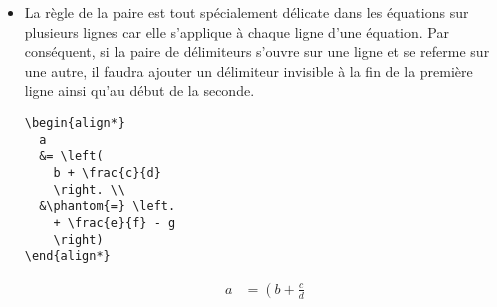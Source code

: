 \begin{itemize}
\begin{demo}
\begin{texample}
\begin{equation*}
\begin{aligned}
            1 - x, &\quad x < 1 \\
            x - 1, &\quad x \geq 1
          \end{aligned}
        \right.
      \end{equation*}
    \end{texample}
  \end{demo}
  (L'environnement  utilisé ci-dessus provient de
  .) On notera au passage que l'environnement 
  de  rend plus simple la réalisation de constructions
  comme celle ci-dessus.
  \begin{demo}
    \begin{texample}
\begin{lstlisting}
f(x) =
\begin{cases}
  1 - x, & x < 1 \\
  x - 1, & x \geq 1
\end{cases}
\end{lstlisting}
      \producing
      \begin{equation*}
        f(x) =
        \begin{cases}
          1 - x, & x < 1 \\
          x - 1, & x \geq 1
        \end{cases}
      \end{equation*}
    \end{texample}
  \end{demo}
%
\item La règle de la paire est tout spécialement délicate dans les
  équations sur plusieurs lignes car elle s'applique à chaque ligne
  d'une équation. Par conséquent, si la paire de délimiteurs s'ouvre
  sur une ligne et se referme sur une autre, il faudra ajouter un
  délimiteur invisible à la fin de la première ligne ainsi qu'au début
  de la seconde.
  \begin{demo}
    \begin{texample}
\begin{lstlisting}
\begin{align*}
  a
  &= \left(
    b + \frac{c}{d}
    \right. \\
  &\phantom{=} \left.
    + \frac{e}{f} - g
    \right)
\end{align*}
\end{lstlisting}
      \producing
      \begin{align*}
        a
        &= \left(
          b + \frac{c}{d}
          \right. \\
        &\phantom{=} \left.

\end{align*}
\end{texample}
\end{demo}
\end{itemize}
